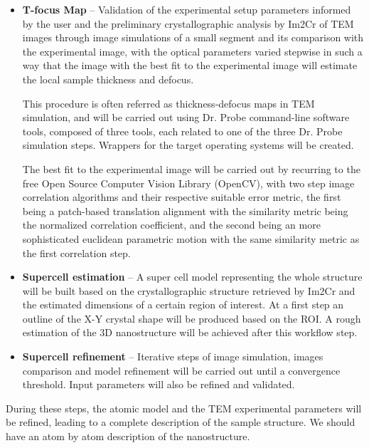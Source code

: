 \documentclass[
  oneside,
  11pt, a4paper,
  footinclude=true,
  headinclude=true,
  cleardoublepage=empty
]{scrbook}
\begin{document}
\begin{itemize}
    \item \textbf{T-focus Map} -- Validation of the experimental setup parameters informed by the
user and the preliminary crystallographic analysis by Im2Cr \citep{asilva2016} of TEM images  through image simulations of a small segment and its
comparison with the experimental image, with the optical parameters varied stepwise in such a way that the image with the best fit to the experimental image will estimate the local sample thickness and defocus.\par This procedure is often referred as thickness-defocus maps in
TEM simulation, and 
will be carried out using Dr. Probe \citep{drprobe} %
		command-line software tools, composed of three tools, each related to one of the three Dr. Probe simulation steps. Wrappers for the target operating systems will be created.\par  The best fit to the experimental image will be carried out by recurring to the free Open Source Computer Vision Library (OpenCV), with two step image correlation algorithms and their respective suitable error metric, the first being a patch-based translation alignment with the similarity metric being the normalized correlation coefficient, and the second being an more sophisticated euclidean parametric motion with the same similarity metric as the first correlation step.
		
		
\item  \textbf{Supercell estimation} --  A super cell model representing the whole structure will be built based on the crystallographic structure
retrieved by Im2Cr \citep{asilva2016} and the estimated dimensions of a certain region of interest. At a first step an outline of the X-Y crystal shape will be produced based on the ROI. A rough estimation of the 3D nanostructure will be achieved after this workflow step.\par 




\item \textbf{Supercell refinement} -- Iterative steps of image
simulation, images comparison and model refinement will be carried out until a convergence threshold. Input parameters will also be refined and validated.\par  
\end{itemize}



During these steps, the atomic model and the TEM experimental parameters will be refined, leading to a
complete description of the sample structure. We should have an atom by atom description of the nanostructure.\par 	
\end{document}
